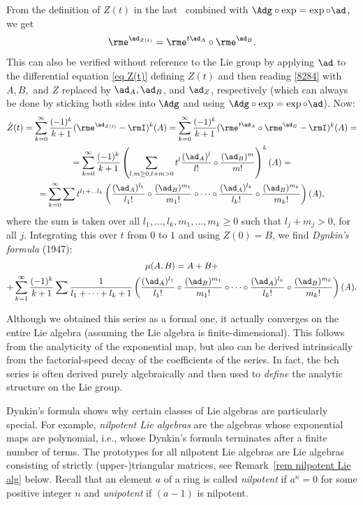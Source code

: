 From the definition of $Z(t)$ in the last \sect\ combined with $\Adg\circ \exp=\exp\circ\ad$, we get
\[\rme^{\ad_{Z(t)}}=\rme^{t\ad_A}\circ \rme^{\ad_B}.\]
This can also be verified without reference to the Lie group by applying $\ad$ to the differential equation \eqref{eq Z(t)} defining $Z(t)$ and then reading \eqref{8284} with $A,B,$ and $Z$ replaced by $\ad_A,\ad_B$, and $\ad_Z$, respectively (which can always be done by sticking both sides into $\Adg$ and using $\Adg\circ\exp=\exp\circ\ad$). Now:
\begin{multline}
    \dot Z(t)=\sum_{k=0}^\infty \frac{(-1)^k}{k+1}(\rme^{\ad_{Z(t)}}-\rmI)^k(A)=\sum_{k=0}^\infty \frac{(-1)^k}{k+1}(\rme^{t\ad_A}\circ \rme^{\ad_B}-\rmI)^k(A)=\\
    =\sum_{k=0}^\infty \frac{(-1)^k}{k+1}\left(\sum_{l,m\geq 0,l+m>0}t^l\frac{(\ad_A)^l}{l!}\circ \frac{(\ad_B)^m}{m!}\right)^k (A)=\\
    =\sum_{k=0}^\infty \sum t^{l_1+\ldots l_k}
    \left(
    \frac{(\ad_A)^{l_1}}{l_1!}\circ
    \frac{(\ad_B)^{m_1}}{m_1!}\circ\cdots\circ
    \frac{(\ad_A)^{l_k}}{l_k!}\circ
    \frac{(\ad_B)^{m_k}}{m_k!}
    \right)(A),
\end{multline}
where the sum is taken over all $l_1,\ldots,l_k,m_1,\ldots,m_k\geq 0$ such that $l_j+m_j>0$, for all $j$. Integrating this over $t$ from $0$ to $1$ and using $Z(0)=B$, we find \emph{Dynkin's formula} (1947):
\begin{multline}
    \mu(A,B)=A+B+\\+\sum_{k=1}^\infty \frac{(-1)^k}{k+1}\sum \frac{1}{l_1+\cdots+l_k+1}\left(    
    \frac{(\ad_A)^{l_1}}{l_1!}\circ
    \frac{(\ad_B)^{m_1}}{m_1!}\circ\cdots\circ
    \frac{(\ad_A)^{l_k}}{l_k!}\circ
    \frac{(\ad_B)^{m_k}}{m_k!}\right)(A).
\end{multline}

\begin{rem}
    Although we obtained this series as a formal one, it actually converges on the entire Lie algebra (assuming the Lie algebra is finite-dimensional). This follows from the analyticity of the exponential map, but also can be derived intrinsically from the factorial-speed decay of the coefficients of the series. In fact, the \gls{bch} series is often derived purely algebraically and then used to \emph{define} the analytic structure on the Lie group.
\end{rem}

Dynkin's formula shows why certain classes of Lie algebras are particularly special. For example, \emph{nilpotent Lie algebras} are the algebras whose exponential maps are polynomial, i.e., whose Dynkin's formula terminates after a finite number of terms. The prototypes for all nilpotent Lie algebras are Lie algebras consisting of strictly (upper-)triangular matrices, see Remark~\ref{rem nilpotent Lie alg} below. Recall that an element $a$ of a ring is called \emph{nilpotent} if $a^n=0$ for some positive integer $n$ and \emph{unipotent} if $(a-1)$ is nilpotent.

